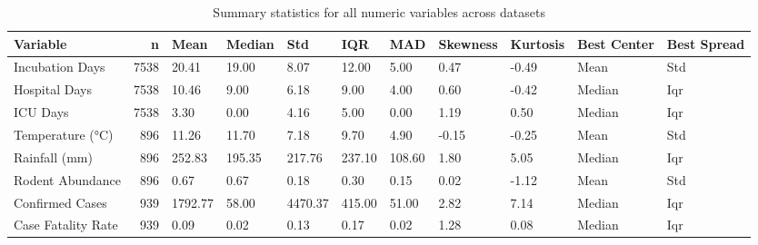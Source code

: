 \begin{table}[htbp]
\caption{Summary statistics for all numeric variables across datasets}
\label{tab:master}
\begin{tabular}{lrlllllllll}
\toprule
Variable & n & Mean & Median & Std & IQR & MAD & Skewness & Kurtosis & Best Center & Best Spread \\
\midrule
Incubation Days & 7538 & 20.41 & 19.00 & 8.07 & 12.00 & 5.00 & 0.47 & -0.49 & Mean & Std \\
Hospital Days & 7538 & 10.46 & 9.00 & 6.18 & 9.00 & 4.00 & 0.60 & -0.42 & Median & Iqr \\
ICU Days & 7538 & 3.30 & 0.00 & 4.16 & 5.00 & 0.00 & 1.19 & 0.50 & Median & Iqr \\
Temperature (°C) & 896 & 11.26 & 11.70 & 7.18 & 9.70 & 4.90 & -0.15 & -0.25 & Mean & Std \\
Rainfall (mm) & 896 & 252.83 & 195.35 & 217.76 & 237.10 & 108.60 & 1.80 & 5.05 & Median & Iqr \\
Rodent Abundance & 896 & 0.67 & 0.67 & 0.18 & 0.30 & 0.15 & 0.02 & -1.12 & Mean & Std \\
Confirmed Cases & 939 & 1792.77 & 58.00 & 4470.37 & 415.00 & 51.00 & 2.82 & 7.14 & Median & Iqr \\
Case Fatality Rate & 939 & 0.09 & 0.02 & 0.13 & 0.17 & 0.02 & 1.28 & 0.08 & Median & Iqr \\
\bottomrule
\end{tabular}
\end{table}
